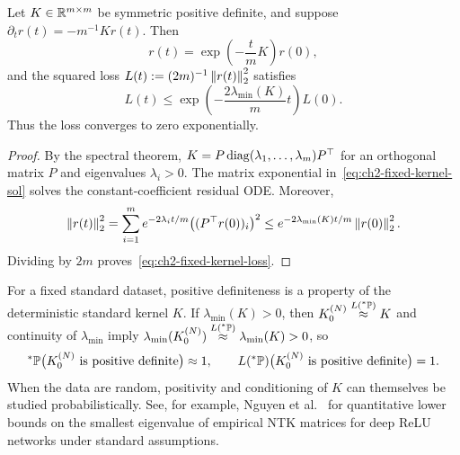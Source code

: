 \begin{proposition}\label{prop:ch2-fixed-kernel-exp}
Let $K \in \mathbb{R}^{m \times m}$ be symmetric positive definite, and suppose $\partial_t r(t) = -m^{-1} K r(t)$. Then
\begin{equation}\label{eq:ch2-fixed-kernel-sol}
r(t) = \exp\!\left(-\frac{t}{m} K\right) r(0),
\end{equation}
and the squared loss $L(t) := (2m)^{-1}\left\lVert r(t) \right\rVert_2^2$ satisfies
\begin{equation}\label{eq:ch2-fixed-kernel-loss}
L(t) \le \exp\!\left(-\frac{2\lambda_{\min}(K)}{m} t\right) L(0).
\end{equation}
Thus the loss converges to zero exponentially.
\end{proposition}

\begin{proof}
By the spectral theorem, $K = P \operatorname{diag}(\lambda_1, \dots, \lambda_m) P^\top$ for an orthogonal matrix $P$ and eigenvalues $\lambda_i > 0$. The matrix exponential in~\eqref{eq:ch2-fixed-kernel-sol} solves the constant-coefficient residual ODE. Moreover,
\begin{equation}\label{eq:ch2-fixed-kernel-norm}
\left\lVert r(t) \right\rVert_2^2 = \sum_{i=1}^{m} e^{-2\lambda_i t / m} \bigl((P^\top r(0))_i\bigr)^2 \le e^{-2\lambda_{\min}(K) t / m} \left\lVert r(0) \right\rVert_2^2.
\end{equation}
Dividing by $2m$ proves~\eqref{eq:ch2-fixed-kernel-loss}.
\end{proof}

\begin{remark}\label{rem:ch2-lambda-min}
For a fixed standard dataset, positive definiteness is a property of the deterministic standard kernel $K$. If $\lambda_{\min}(K) > 0$, then $K_0^{(N)} \stackrel{L({}^*\mathbb{P})}{\approx} K$ and continuity of $\lambda_{\min}$ imply $\lambda_{\min}(K_0^{(N)}) \stackrel{L({}^*\mathbb{P})}{\approx} \lambda_{\min}(K) > 0$, so
\begin{equation}\label{eq:ch2-k0-pd}
{}^*\mathbb{P}\bigl(K_0^{(N)} \text{ is positive definite}\bigr) \approx 1, \qquad
L({}^*\mathbb{P})\bigl(K_0^{(N)} \text{ is positive definite}\bigr) = 1.
\end{equation}
When the data are random, positivity and conditioning of $K$ can themselves be studied probabilistically. See, for example, Nguyen et al.~\cite{nguyen2021tight} for quantitative lower bounds on the smallest eigenvalue of empirical NTK matrices for deep ReLU networks under standard assumptions.
\end{remark}

